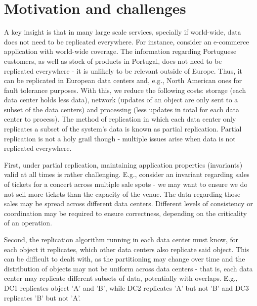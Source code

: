 \section{Motivation and challenges}
A key insight is that in many large scale services, specially if world-wide, 
data does not need to be replicated everywhere.
For instance, consider an e-commerce application with world-wide coverage.
The information regarding Portuguese customers, as well as stock of products in Portugal, does not need to be replicated everywhere - it is unlikely to be relevant outside of Europe.
Thus, it can be replicated in European data centers and, e.g., North American ones for fault tolerance purposes.
With this, we reduce the following costs: storage (each data center holds less data), network (updates of an object are only sent to a subset of the data centers) and processing (less updates in total for each data center to process).
The method of replication in which each data center only replicates a subset of the system's data is known as partial replication.
Partial replication is not a holy grail though - multiple issues arise when data is not replicated everywhere.

First, under partial replication, maintaining application properties (invariants) valid at all times is rather challenging. %
E.g., consider an invariant regarding sales of tickets for a concert across multiple sale spots - we may want to ensure we do not sell more tickets than the capacity of the venue.
The data regarding those sales may be spread across different data centers.
Different levels of consistency or coordination may be required to ensure correctness, depending on the criticality of an operation. 

Second, the replication algorithm running in each data center must know, for each object it replicates, which other data centers also replicate said object.
This can be difficult to dealt with, as the partitioning may change over time and the distribution of objects may not be uniform across data centers - that is, each data center may replicate different subsets of data, potentially with overlaps.
E.g., DC1 replicates object 'A' and 'B', while DC2 replicates 'A' but not 'B' and DC3 replicates 'B' but not 'A'.

